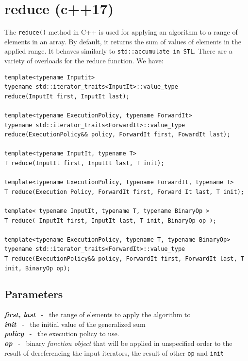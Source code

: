 \documentclass{report}
\begin{document}
    \section{reduce (c++17)}
    The \texttt{reduce()} method in C++ is used for applying an algorithm to a range of elements in an array. By default, it returns the sum of values of elements in the applied range. It behaves similarly to \texttt{std::accumulate in STL}.
    \bigbreak \noindent
    There are a variety of overloads for the reduce function. We have:
    \begin{verbatim}
template<typename Inputit>
typename std::iterator_traits<InputIt>::value_type
reduce(InputIt first, InputIt last);
     
template<typename ExecutionPolicy, typename ForwardIt>
typename std::iterator_traits<ForwardIt>::value_type
reduce(ExecutionPolicy&& policy, ForwardIt first, FowardIt last);
    
template<typename InputIt, typename T>
T reduce(InputIt first, InputIt last, T init);

template<typename ExecutionPolicy, typename ForwardIt, typename T>
T reduce(Execution Policy, ForwardIt first, Forward It last, T init);

template< typename InputIt, typename T, typename BinaryOp >
T reduce( InputIt first, InputIt last, T init, BinaryOp op );
    
template<typename ExecutionPolicy, typename T, typename BinaryOp>
typename std::iterator_traits<ForwardIt>::value_type
T reduce(ExecutionPolicy&& policy, ForwardIt first, ForwardIt last, T init, BinaryOp op);
    \end{verbatim}
    \subsection*{Parameters}
    \textit{\textbf{first, last}}  \ - \ the range of elements to apply the algorithm to \vspace{1.5mm} \\ 
    \textit{\textbf{init}} \ - \ the initial value of the generalized sum \vspace{1.5mm} \\
    \textit{\textbf{policy}} \ - \ the execution policy to use. \vspace{1.5mm} \\
    \textit{\textbf{op}} \ - \ binary \textit{function object} that will be applied in unspecified order to the result of dereferencing the input iterators, the result of other \texttt{op} and \texttt{init}
\end{document}
